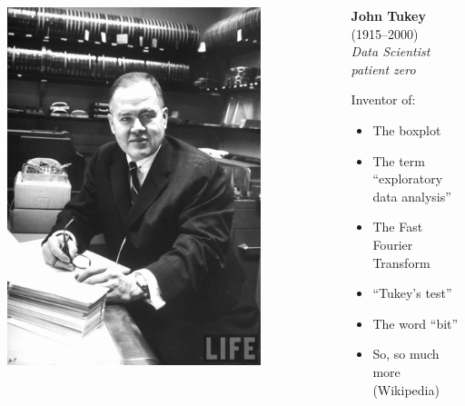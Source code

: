\documentclass[xcolor=table,aspectratio=169]{beamer}
\begin{document}
\begin{frame}{}
  \begin{columns}
    \begin{column}{.5\textwidth}

      \includegraphics[width=0.78\textwidth]{pics/tukey.jpg}
    \end{column}
    \begin{column}{.5\textwidth}
      \textbf{John Tukey} {\footnotesize (1915--2000)}\\
      \emph{Data Scientist patient zero}\bigskip

      \begin{small}
      Inventor of:
      
      \begin{itemize}
        \item The boxplot
        \item The term ``exploratory data analysis''
        \item The Fast Fourier Transform
        \item ``Tukey's test''
        \item The word ``bit''
        \item So, so much more (Wikipedia)
      \end{itemize}
        
      \end{small}
    \end{column}
  \end{columns}
\end{frame}
\end{document}
